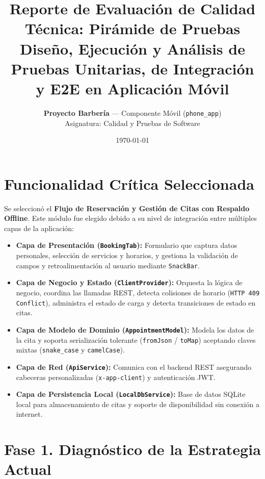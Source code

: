 \documentclass[11pt,a4paper]{article}
\title{\textbf{Reporte de Evaluación de Calidad Técnica: Pirámide de Pruebas}\\
\large Diseño, Ejecución y Análisis de Pruebas Unitarias, de Integración y E2E en Aplicación Móvil}
\author{\textbf{Proyecto Barbería} --- Componente Móvil (\texttt{phone\_app})\\
Asignatura: Calidad y Pruebas de Software}
\date{\today}
\begin{document}

\maketitle
\newpage
\tableofcontents
\newpage

\section{Funcionalidad Crítica Seleccionada}

Se seleccionó el \textbf{Flujo de Reservación y Gestión de Citas con Respaldo Offline}. Este módulo fue elegido debido a su nivel de integración entre múltiples capas de la aplicación:

\begin{itemize}
    \item \textbf{Capa de Presentación (\texttt{BookingTab}):} Formulario que captura datos personales, selección de servicios y horarios, y gestiona la validación de campos y retroalimentación al usuario mediante \texttt{SnackBar}.
    \item \textbf{Capa de Negocio y Estado (\texttt{ClientProvider}):} Orquesta la lógica de negocio, coordina las llamadas REST, detecta colisiones de horario (\texttt{HTTP 409 Conflict}), administra el estado de carga y detecta transiciones de estado en citas.
    \item \textbf{Capa de Modelo de Dominio (\texttt{AppointmentModel}):} Modela los datos de la cita y soporta serialización tolerante (\texttt{fromJson} / \texttt{toMap}) aceptando claves mixtas (\texttt{snake\_case} y \texttt{camelCase}).
    \item \textbf{Capa de Red (\texttt{ApiService}):} Comunica con el backend REST asegurando cabeceras personalizadas (\texttt{x-app-client}) y autenticación JWT.
    \item \textbf{Capa de Persistencia Local (\texttt{LocalDbService}):} Base de datos SQLite local para almacenamiento de citas y soporte de disponibilidad sin conexión a internet.
\end{itemize}

\section{Fase 1. Diagnóstico de la Estrategia Actual}
\end{document}
